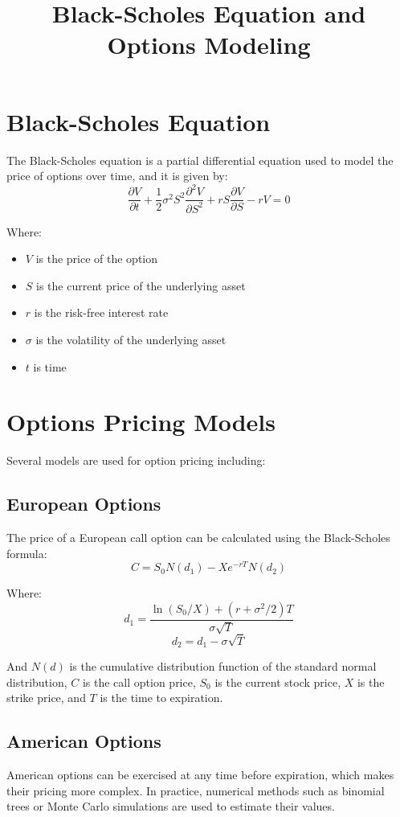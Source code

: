 \documentclass{article}
\title{Black-Scholes Equation and Options Modeling}
\begin{document}
\maketitle

\section{Black-Scholes Equation}
The Black-Scholes equation is a partial differential equation used to model the price of options over time, and it is given by:
\begin{equation}
\frac{\partial V}{\partial t} + \frac{1}{2} \sigma^2 S^2 \frac{\partial^2 V}{\partial S^2} + rS \frac{\partial V}{\partial S} - rV = 0
\end{equation}

Where:
\begin{itemize}
  \item $V$ is the price of the option
  \item $S$ is the current price of the underlying asset
  \item $r$ is the risk-free interest rate
  \item $\sigma$ is the volatility of the underlying asset
  \item $t$ is time
\end{itemize}

\section{Options Pricing Models}
Several models are used for option pricing including:
\subsection{European Options}
The price of a European call option can be calculated using the Black-Scholes formula:
\begin{equation}
C = S_0 N(d_1) - Xe^{-rT} N(d_2)
\end{equation}

Where:
\begin{equation}
d_1 = \frac{\ln(S_0/X) + (r + \sigma^2/2)T}{\sigma\sqrt{T}}
\end{equation}
\begin{equation}
d_2 = d_1 - \sigma\sqrt{T}
\end{equation}

And $N(d)$ is the cumulative distribution function of the standard normal distribution, $C$ is the call option price, $S_0$ is the current stock price, $X$ is the strike price, and $T$ is the time to expiration.

\subsection{American Options}
American options can be exercised at any time before expiration, which makes their pricing more complex. In practice, numerical methods such as binomial trees or Monte Carlo simulations are used to estimate their values.
\end{document}
